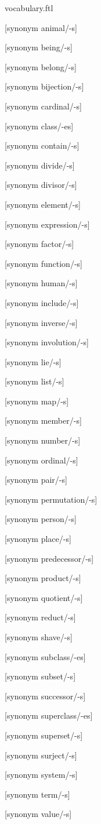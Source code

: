 \documentclass{stex}
\begin{document}
\begin{smodule}{vocabulary.ftl}
  \begin{forthel}

    [synonym animal/-s]

    [synonym being/-s]

    [synonym belong/-s]

    [synonym bijection/-s]

    [synonym cardinal/-s]

    [synonym class/-es]

    [synonym contain/-s]

    [synonym divide/-s]

    [synonym divisor/-s]

    [synonym element/-s]

    [synonym expression/-s]

    [synonym factor/-s]

    [synonym function/-s]

    [synonym human/-s]

    [synonym include/-s]

    [synonym inverse/-s]

    [synonym involution/-s]

    [synonym lie/-s]

    [synonym list/-s]

    [synonym map/-s]

    [synonym member/-s]

    [synonym number/-s]

    [synonym ordinal/-s]

    [synonym pair/-s]

    [synonym permutation/-s]

    [synonym person/-s]

    [synonym place/-s]

    [synonym predecessor/-s]

    [synonym product/-s]

    [synonym quotient/-s]

    [synonym reduct/-s]
    
    [synonym shave/-s]

    [synonym subclass/-es]

    [synonym subset/-s]

    [synonym successor/-s]

    [synonym superclass/-es]

    [synonym superset/-s]

    [synonym surject/-s]

    [synonym system/-s]

    [synonym term/-s]

    [synonym value/-s]
  \end{forthel}
\end{smodule}
\end{document}
